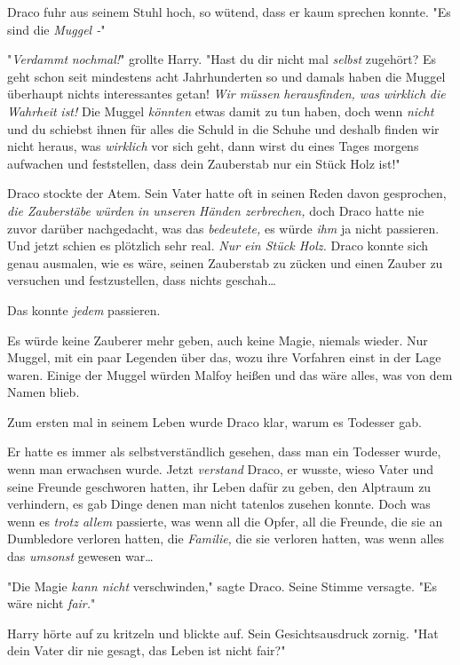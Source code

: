 {Draco fuhr aus seinem Stuhl hoch, so wütend, dass er kaum sprechen konnte. "Es sind die \emph{Muggel -}"

"\emph{Verdammt} \emph{nochmal!}" grollte Harry. "Hast du dir nicht mal \emph{selbst} zugehört? Es geht schon seit mindestens acht Jahrhunderten so und damals haben die Muggel überhaupt nichts interessantes getan! \emph{Wir müssen} \emph{herausfinden, was} \emph{wirklich} \emph{die} \emph{Wahrheit} \emph{ist!} Die Muggel \emph{könnten} etwas damit zu tun haben, doch wenn \emph{nicht} und du schiebst ihnen für alles die Schuld in die Schuhe und deshalb finden wir nicht heraus, was \emph{wirklich} vor sich geht, dann wirst du eines Tages morgens aufwachen und feststellen, dass dein Zauberstab nur ein Stück Holz ist!"

Draco stockte der Atem. Sein Vater hatte oft in seinen Reden davon gesprochen, \emph{die Zauberstäbe würden} \emph{in unseren} \emph{Händen zerbrechen,} doch Draco hatte nie zuvor darüber nachgedacht, was das \emph{bedeutete,} es würde \emph{ihm} ja nicht passieren. Und jetzt schien es plötzlich sehr real. \emph{Nur ein Stück Holz.} Draco konnte sich genau ausmalen, wie es wäre, seinen Zauberstab zu zücken und einen Zauber zu versuchen und festzustellen, dass nichts geschah…

Das konnte \emph{jedem} passieren.

Es würde keine Zauberer mehr geben, auch keine Magie, niemals wieder. Nur Muggel, mit ein paar Legenden über das, wozu ihre Vorfahren einst in der Lage waren. Einige der Muggel würden Malfoy heißen und das wäre alles, was von dem Namen blieb.

Zum ersten mal in seinem Leben wurde Draco klar, warum es Todesser gab.

Er hatte es immer als selbstverständlich gesehen, dass man ein Todesser wurde, wenn man erwachsen wurde. Jetzt \emph{verstand} Draco, er wusste, wieso Vater und seine Freunde geschworen hatten, ihr Leben dafür zu geben, den Alptraum zu verhindern, es gab Dinge denen man nicht tatenlos zusehen konnte. Doch was wenn es \emph{trotz allem} passierte, was wenn all die Opfer, all die Freunde, die sie an Dumbledore verloren hatten, die \emph{Familie,} die sie verloren hatten, was wenn alles das \emph{umsonst} gewesen war…

"Die Magie \emph{kann nicht} verschwinden," sagte Draco. Seine Stimme versagte. "Es wäre nicht \emph{fair.}"

Harry hörte auf zu kritzeln und blickte auf. Sein Gesichtsausdruck zornig. "Hat dein Vater dir nie gesagt, das Leben ist nicht fair?"

}
